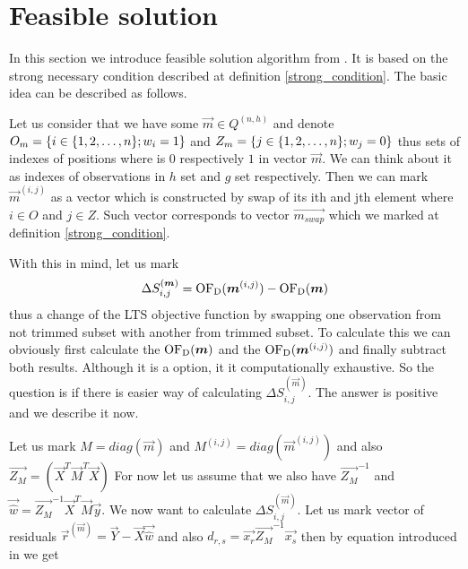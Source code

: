 

\section{Feasible solution} \label{section_feasible_solution}
In this section we introduce feasible solution algorithm from \cite{hawkins:1994}.
It is based on the strong necessary condition described at definition \ref{strong_condition}. 
The basic idea can be described as follows.

Let us consider that we have some $\vec{m} \in Q^{(n,h)}$ and denote $O_m = \{{i \in  \{{  1,2,\ldots , n  \}} ;w_i = 1\}}$ and $Z_m = \{{j \in  \{{  1,2,\ldots , n  \}} ;w_j = 0\}}$ thus sets of indexes of positions where is $0$ respectively $1$ in vector $\vec{m}$. We can think about it as indexes of observations in $h$ set and $g$ set respectively. Then we can mark $\vec{m}^{(i,j)}$ as a vector which is constructed by swap of its ith and jth element where $i \in O$ and $j \in Z$. Such vector corresponds to vector $\vec{m_{swap}}$ which we marked at definition \ref{strong_condition}.

With this in mind, let us mark 
\begin{equation}
    \Delta S^{(\boldsymbol{m})}_{i,j} = \operatorname{OF_D}(\boldsymbol{m}^{(i,j)}) - \operatorname{OF_D}(\boldsymbol{m})
\end{equation}
thus a change of the LTS objective function by swapping one observation from not trimmed subset with another from trimmed subset. To calculate this we can obviously first calculate the  $\operatorname{OF_D}(\boldsymbol{m})$ and  the $ \operatorname{OF_D}(\boldsymbol{m}^{(i,j)})$ and finally subtract both results. Although it is a option, it it computationally exhaustive. So the question is if there is easier way of calculating $\Delta S^{(\vec{m})}_{i,j}$. The answer is positive and we describe it now.

Let us mark  
$M = diag(\vec{m})$ and 
$M^{(i,j)} = diag(\vec{m}^{(i,j)})$ and also
$\vec{Z_M} = (\vec{X}^T\vec{M}^T\vec{X})$
For now let us assume that we also have
$\vec{Z_M}^{-1}$ and $\vec{\hat{w}} = \vec{Z_M}^{-1}\vec{X}^T\vec{M}\vec{y}$.
We now want to calculate $\Delta S^{(\vec{m})}_{i,j}$.
Let us mark vector of residuals 
$\vec{r}^{(\vec{m})} = \vec{Y} - \vec{X} \vec{\hat{w}} $
and also $d_{r,s} = \vec{x_r} \vec{Z_M}^{-1}  \vec{x_s} $
then by equation introduced in \cite{atkinson1991simulated} we get

